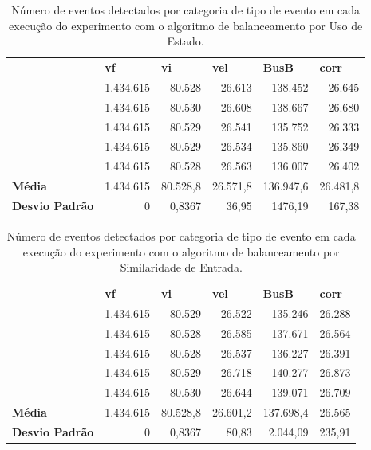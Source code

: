 \begin{table}[h!]
\centering
\caption{Número de eventos detectados por categoria de tipo de evento em cada execução do experimento com o algoritmo de balanceamento por Uso de Estado.}
\begin{tabular}{lrrrrr}
          & \multicolumn{1}{l}{\textbf{vf}} & \multicolumn{1}{l}{\textbf{vi}} & \multicolumn{1}{l}{\textbf{vel}} & \multicolumn{1}{l}{\textbf{BusB}} & \multicolumn{1}{l}{\textbf{corr}}  \\
  & 1.434.615 & 80.528 & 26.613  & 138.452 & 26.645   \\
  & 1.434.615 & 80.530 & 26.608 & 138.667  & 26.680      \\
  & 1.434.615 & 80.529   & 26.541    & 135.752    & 26.333                     \\
  & 1.434.615 & 80.529   & 26.534    & 135.860    & 26.349                     \\
 & 1.434.615 & 80.528   & 26.563    & 136.007    & 26.402                     \\
\textbf{Média}      & 1.434.615 & 80.528,8 & 26.571,8  & 136.947,6  & 26.481,8                   \\
\textbf{Desvio Padrão}   & 0       & 0,8367      & 36,95        & 1476,19         & 167,38         
\end{tabular}
\label{Tab:events_SU_and_avg}
\end{table}


\begin{table}[h!]
\centering
\caption{Número de eventos detectados por categoria de tipo de evento em cada execução do experimento com o algoritmo de balanceamento por Similaridade de Entrada.}
\begin{tabular}{lrrrrr}
          & \multicolumn{1}{l}{\textbf{vf}} & \multicolumn{1}{l}{\textbf{vi}} & \multicolumn{1}{l}{\textbf{vel}} & \multicolumn{1}{l}{\textbf{BusB}} & \multicolumn{1}{l}{\textbf{corr}}  \\
  & 1.434.615 & 80.529   & 26.522    & 135.246    & 26.288                     \\
  & 1.434.615 & 80.528   & 26.585    & 137.671    & 26.564                     \\
  & 1.434.615 & 80.528   & 26.537    & 136.227    & 26.391                     \\
  & 1.434.615 & 80.529   & 26.718    & 140.277    & 26.873                     \\
 & 1.434.615 & 80.530   & 26.644    & 139.071    & 26.709                     \\
\textbf{Média}          & 1.434.615 & 80.528,8 & 26.601,2  & 137.698,4  & 26.565                     \\
\textbf{Desvio Padrão}           & 0       & 0,8367      & 80,83        & 2.044,09         & 235,91         
\end{tabular}
\label{Tab:events_IS_and_avg}
\end{table}


